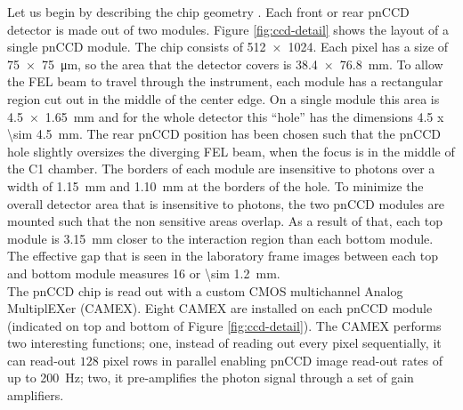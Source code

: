 Let us begin by describing the chip geometry \citep{Bucher-2016-Unpublished}. Each front or rear pnCCD detector is made out of two modules. Figure \ref{fig:ccd-detail} shows the layout of a single pnCCD module. The chip consists of \SI{512 x 1024}{\pixels}. Each pixel has a size of \SI{75 x 75}{\micro\meter}, so the area that the detector covers is \SI{38.4 x 76.8}{\milli\meter}. To allow the FEL beam to travel through the instrument, each module has a rectangular region cut out in the middle of the center edge. On a single module this area is \SI{4.5 x 1.65}{\milli\meter} and for the whole detector this ``hole'' has the dimensions \SI{4.5 x \sim 4.5}{\milli\meter}. The rear pnCCD position has been chosen such that the pnCCD hole slightly oversizes the diverging FEL beam, when the focus is in the middle of the C1 chamber. The borders of each module are insensitive to photons over a width of \SI{1.15}{\milli\meter} and \SI{1.10}{\milli\meter} at the borders of the hole. To minimize the overall detector area that is insensitive to photons, the two pnCCD modules are mounted such that the non sensitive areas overlap. As a result of that, each top module is \SI{3.15}{\milli\meter} closer to the interaction region than each bottom module. The effective gap that is seen in the laboratory frame images between each top and bottom module measures \SI{16}{\pixels} or \SI{\sim 1.2}{\milli\meter}.\\[1\baselineskip]
%
The pnCCD chip is read out with a custom CMOS multichannel Analog MultiplEXer (CAMEX). Eight CAMEX are installed on each pnCCD module (indicated on top and bottom of Figure \ref{fig:ccd-detail}). The CAMEX performs two interesting functions; one, instead of reading out every pixel sequentially, it can read-out $128$ pixel rows in parallel enabling pnCCD image read-out rates of up to \SI{200}{\hertz}; two, it pre-amplifies the photon signal through a set of gain amplifiers.
